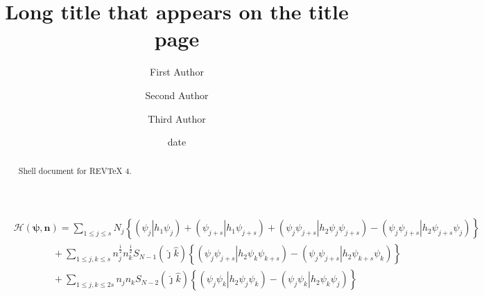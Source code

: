 \documentclass[aps,preprint]{revtex4}%
\begin{document}
\title[Short title for running header]{Long title that appears on the title page}
\author{First Author}
\author{Second Author}
\author{Third Author}

\begin{abstract}
Shell document for REV\TeX{} 4.

\end{abstract}
\date[Date text]{date}




\maketitle
\tableofcontents
%

\begin{align}
&  \mathcal{H}\left(  \mathbf{\psi,n}\right)  =\sum_{1\leq j\leq s}%
N_{j}\left\{  \left(  \left.  \psi_{j}\right\vert h_{1}\psi_{j}\right)
+\left(  \left.  \psi_{j+s}\right\vert h_{1}\psi_{j+s}\right)  +\left(
\left.  \psi_{j}\psi_{j+s}\right\vert h_{2}\psi_{j}\psi_{j+s}\right)  -\left(
\left.  \psi_{j}\psi_{j+s}\right\vert h_{2}\psi_{j+s}\psi_{j}\right)  \right\}
\nonumber\\
&  \qquad\qquad+\sum_{1\leq j,k\leq s}n_{j}^{\frac{1}{2}}n_{k}^{\frac{1}{2}%
}S_{N-1}\left(  \hat{\jmath}\hat{k}\right)  \left\{  \left(  \left.  \psi
_{j}\psi_{j+s}\right\vert h_{2}\psi_{k}\psi_{k+s}\right)  -\left(  \left.
\psi_{j}\psi_{j+s}\right\vert h_{2}\psi_{k+s}\psi_{k}\right)  \right\}
\nonumber\\
&  \qquad\qquad+\sum_{1\leq j,k\leq2s}n_{j}n_{k}S_{N-2}\left(  \hat{\jmath
}\hat{k}\right)  \left\{  \left(  \left.  \psi_{j}\psi_{k}\right\vert
h_{2}\psi_{j}\psi_{k}\right)  -\left(  \left.  \psi_{j}\psi_{k}\right\vert
h_{2}\psi_{k}\psi_{j}\right)  \right\}  \label{unnormE}%
\end{align}
%
\end{document}
